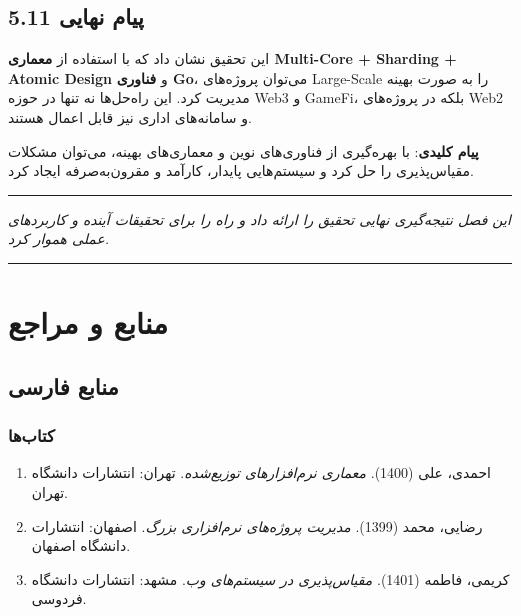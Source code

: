 \documentclass[
]{article}
\begin{document}
\subsection{5.11 پیام
نهایی}\label{ux67eux6ccux627ux645-ux646ux647ux627ux6ccux6cc}

این تحقیق نشان داد که با استفاده از \textbf{معماری Multi-Core + Sharding
+ Atomic Design} و \textbf{فناوری Go}، می‌توان پروژه‌های Large-Scale را به
صورت بهینه مدیریت کرد. این راه‌حل‌ها نه تنها در حوزه Web3 و GameFi، بلکه
در پروژه‌های Web2 و سامانه‌های اداری نیز قابل اعمال هستند.

\textbf{پیام کلیدی}: با بهره‌گیری از فناوری‌های نوین و معماری‌های بهینه،
می‌توان مشکلات مقیاس‌پذیری را حل کرد و سیستم‌هایی پایدار، کارآمد و
مقرون‌به‌صرفه ایجاد کرد.

\begin{center}\rule{0.5\linewidth}{0.5pt}\end{center}

\emph{این فصل نتیجه‌گیری نهایی تحقیق را ارائه داد و راه را برای تحقیقات
آینده و کاربردهای عملی هموار کرد.}

\begin{center}\rule{0.5\linewidth}{0.5pt}\end{center}

\section{منابع و
مراجع}\label{ux645ux646ux627ux628ux639-ux648-ux645ux631ux627ux62cux639}

\subsection{منابع
فارسی}\label{ux645ux646ux627ux628ux639-ux641ux627ux631ux633ux6cc}

\subsubsection{کتاب‌ها}\label{ux6a9ux62aux627ux628ux647ux627}

\begin{enumerate}
\def\labelenumi{\arabic{enumi}.}
\item
  احمدی، علی (1400). \emph{معماری نرم‌افزارهای توزیع‌شده}. تهران: انتشارات
  دانشگاه تهران.
\item
  رضایی، محمد (1399). \emph{مدیریت پروژه‌های نرم‌افزاری بزرگ}. اصفهان:
  انتشارات دانشگاه اصفهان.
\item
  کریمی، فاطمه (1401). \emph{مقیاس‌پذیری در سیستم‌های وب}. مشهد: انتشارات
  دانشگاه فردوسی.
\end{enumerate}
\end{document}
